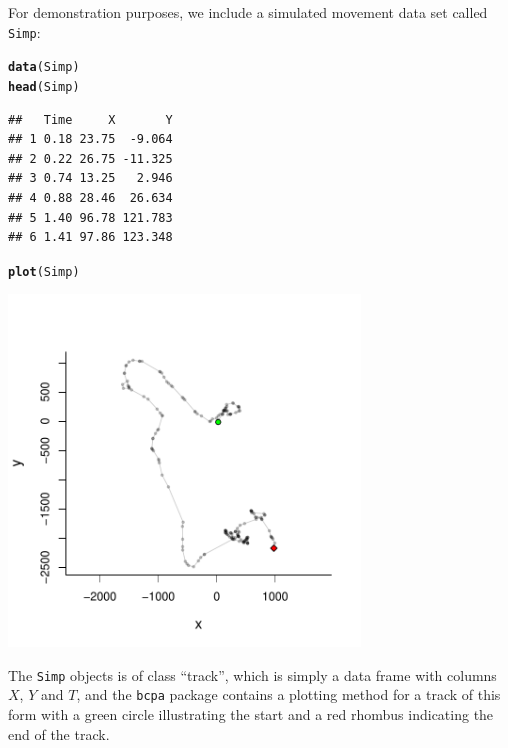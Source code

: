\documentclass[10pt]{article}\usepackage[]{graphicx}\usepackage[]{color}
\makeatletter
\newcommand{\hlstd}[1]{\textcolor[rgb]{0.345,0.345,0.345}{#1}}%
\newcommand{\hlkwd}[1]{\textcolor[rgb]{0.737,0.353,0.396}{\textbf{#1}}}%
\newenvironment{kframe}{%
 \def\at@end@of@kframe{}%
 \ifinner\ifhmode%
  \def\at@end@of@kframe{\end{minipage}}%
  \begin{minipage}{\columnwidth}%
 \fi\fi%
 \def\FrameCommand##1{\hskip\@totalleftmargin \hskip-\fboxsep
 \colorbox{shadecolor}{##1}\hskip-\fboxsep
     \hskip-\linewidth \hskip-\@totalleftmargin \hskip\columnwidth}%
 \MakeFramed {\advance\hsize-\width
   \@totalleftmargin\z@ \linewidth\hsize
   \@setminipage}}%
 {\par\unskip\endMakeFramed%
 \at@end@of@kframe}
\newenvironment{knitrout}{}{} %
\newcommand{\bc}{\begin{center}}
\newcommand{\ec}{\end{center}}
\makeatother
\begin{document}
For demonstration purposes, we include a simulated movement data set called \texttt{Simp}:
\bc
\begin{knitrout}
\color{fgcolor}\begin{kframe}
\begin{alltt}
\hlkwd{data}\hlstd{(Simp)}
\hlkwd{head}\hlstd{(Simp)}
\end{alltt}
\begin{verbatim}
##   Time     X       Y
## 1 0.18 23.75  -9.064
## 2 0.22 26.75 -11.325
## 3 0.74 13.25   2.946
## 4 0.88 28.46  26.634
## 5 1.40 96.78 121.783
## 6 1.41 97.86 123.348
\end{verbatim}
\begin{alltt}
\hlkwd{plot}\hlstd{(Simp)}
\end{alltt}
\end{kframe}
\includegraphics[width=0.7\textwidth]{figure/Simp} 

\end{knitrout}

\ec
The \texttt{Simp} objects is of class ``track'', which is simply a data frame with columns $X$, $Y$ and $T$, and the \texttt{bcpa} package contains a plotting method for  a track of this form with a green circle illustrating the start and a red rhombus indicating the end of the track.
\end{document}
